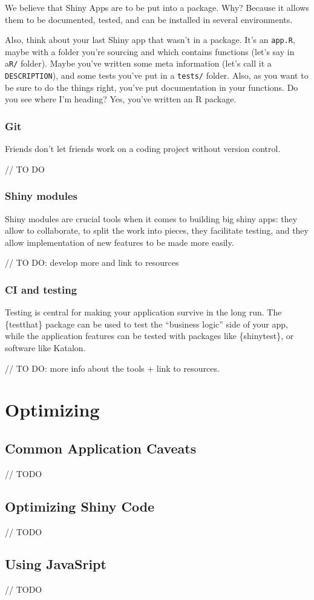\documentclass[]{book}
\begin{document}
We believe that Shiny Apps are to be put into a package. Why? Because it allows them to be documented, tested, and can be installed in several environments.

Also, think about your last Shiny app that wasn't in a package. It's an \texttt{app.R}, maybe with a folder you're sourcing and which contains functions (let's say in a\texttt{R/} folder). Maybe you've written some meta information (let's call it a \texttt{DESCRIPTION}), and some tests you've put in a \texttt{tests/} folder. Also, as you want to be sure to do the things right, you've put documentation in your functions. Do you see where I'm heading? Yes, you've written an R package.

\hypertarget{git}{%
\section{Git}\label{git}}

Friends don't let friends work on a coding project without version control.

// TO DO

\hypertarget{shiny-modules}{%
\section{Shiny modules}\label{shiny-modules}}

Shiny modules are crucial tools when it comes to building big shiny apps: they allow to collaborate, to split the work into pieces, they facilitate testing, and they allow implementation of new features to be made more easily.

// TO DO: develop more and link to resources

\hypertarget{ci-and-testing}{%
\section{CI and testing}\label{ci-and-testing}}

Testing is central for making your application survive in the long run. The \{testthat\} package can be used to test the ``business logic'' side of your app, while the application features can be tested with packages like \{shinytest\}, or software like Katalon.

// TO DO: more info about the tools + link to resources.

\hypertarget{part-optimizing}{%
\part{Optimizing}\label{part-optimizing}}

\hypertarget{optim-caveat}{%
\chapter{Common Application Caveats}\label{optim-caveat}}

// TODO

\hypertarget{optim-r}{%
\chapter{Optimizing Shiny Code}\label{optim-r}}

// TODO

\hypertarget{optim-js}{%
\chapter{Using JavaSript}\label{optim-js}}

// TODO
\end{document}
